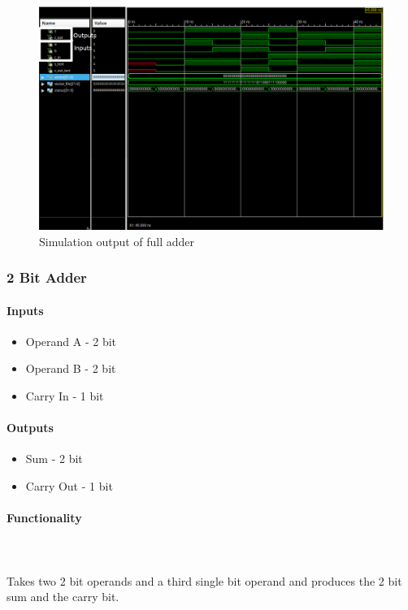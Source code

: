 \documentclass{article}
\begin{document}
    \begin{figure}[H]
        \centering
        \includegraphics[width=0.9\paperwidth,center]{Screenshots/full_adder.png}
        \caption{Simulation output of full adder}
    \end{figure}




    \subsubsection{2 Bit Adder}

    \paragraph{Inputs}
    \begin{itemize}
        \item Operand A - 2 bit
        \item Operand B - 2 bit
        \item Carry In - 1 bit
    \end{itemize}

    \paragraph{Outputs}
    \begin{itemize}
        \item Sum - 2 bit
        \item Carry Out - 1 bit
    \end{itemize}

    \paragraph{Functionality}
    \hfill\\\\
    Takes two 2 bit operands and a third single bit operand and produces the
    2 bit sum and the carry bit.
\end{document}
